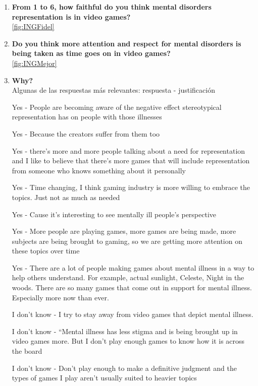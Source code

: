 \documentclass[12pt, a4paper,twoside,titlepage]{book}
\begin{document}
\begin{enumerate}[label=\textbf{\arabic*}.]
     
     \item \textbf{From 1 to 6, how faithful do you think mental disorders representation is in video games?}\\
     \ref{fig:INGFidel}
     \item \textbf{Do you think more attention and respect for mental disorders is being taken as time goes on in video games?}\\
     \ref{fig:INGMejor}
     \item \textbf{Why?}
     \label{mejorIngles}\\
     
     Algunas de las respuestas más relevantes: respuesta - justificación
     
    Yes - People are becoming aware of the negative effect stereotypical representation has on people with those illnesses
    
    Yes - Because the creators suffer from them too
    
    Yes - there's more and more people talking about a need for representation and I like to believe that there's more games that will include representation from someone who knows something about it personally
    
    Yes - Time changing, I think gaming industry is more willing to embrace the topics.  Just not as much as needed
    
    Yes - Cause it's interesting to see mentally ill people's perspective
    
    Yes - More people are playing games, more games are being made, more subjects are being brought to gaming, so we are getting more attention on these topics over time
    
    Yes - There are a lot of people making games about mental illness in a way to help others understand. For example, actual sunlight, Celeste, Night in the woods. There are so many games that come out in support for mental illness. Especially more now than ever.
    
    I don’t know - I try to stay away from video games that depict mental illness.
    
    I don’t know - ``Mental illness has less stigma and is being brought up in video games more. But I don't play enough games to know how it is across the board
    
    I don’t know - Don’t play enough to make a definitive judgment and the types of games I play aren’t usually suited to heavier topics

     
\end{enumerate}
\end{document}
